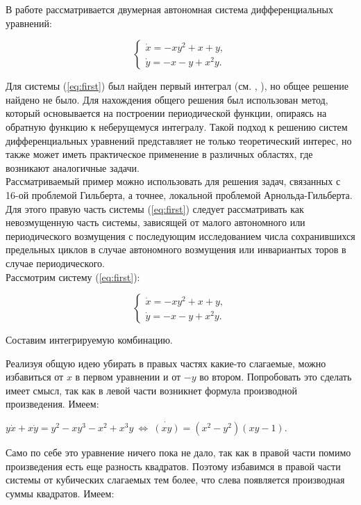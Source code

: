 В работе рассматривается двумерная автономная система дифференциальных уравнений:

\begin{equation}
\begin{cases}
      \dot x=-xy^2+x+y,\\
      \dot y=-x-y+x^2y.
    \end{cases}
    \label{eq:first}
\end{equation}

Для системы (\ref{eq:first}) был найден первый интеграл (см. \cite{basov}, \cite{engl}), но общее решение найдено не было. Для нахождения общего решения был использован метод, который основывается на построении периодической функции, опираясь на обратную функцию к неберущемуся интегралу. Такой подход к решению систем дифференциальных уравнений представляет не только теоретический интерес, но также может иметь практическое применение в различных областях, где возникают аналогичные задачи.\\

Рассматриваемый пример можно использовать для решения задач, связанных с 16-ой проблемой Гильберта, а точнее, локальной проблемой Арнольда-Гильберта. Для этого правую часть системы (\ref{eq:first}) следует рассматривать как невозмущенную часть системы, зависящей от малого автономного или периодического возмущения с последующим исследованием числа сохранившихся предельных циклов в случае автономного возмущения или инвариантых торов в случае периодического.\\

\medskip 
Рассмотрим систему (\ref{eq:first}):

$$
\begin{cases}
      \dot x=-xy^2+x+y,\\
      \dot y=-x-y+x^2y.
    \end{cases}
$$

Составим интегрируемую комбинацию.

\smallskip
Реализуя общую идею убирать в правых частях какие-то слагаемые, можно избавиться от $x$ в первом уравнении и от $-y$  
во втором. Попробовать это сделать имеет смысл, так как в левой части возникнет формула производной произведения. Имеем:

\smallskip
$y\dot x+x\dot y=y^2-xy^3-x^2+x^3y\ \Leftrightarrow\ \dot{(xy)}=(x^2-y^2)(xy-1).$

\smallskip
Само по себе это уравнение ничего пока не дало, так как в правой части помимо произведения есть еще разность квадратов. 
Поэтому избавимся в правой части системы от кубических слагаемых тем более, что слева появляется производная суммы квадратов. Имеем: 

